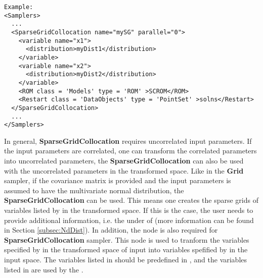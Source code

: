 
\footnotesize
\begin{lstlisting}[style=XML]
Example:
<Samplers>
  ...
  <SparseGridCollocation name="mySG" parallel="0">
    <variable name="x1">
      <distribution>myDist1</distribution>
    </variable>
    <variable name="x2">
      <distribution>myDist2</distribution>
    </variable>
    <ROM class = 'Models' type = 'ROM' >SCROM</ROM>
    <Restart class = 'DataObjects' type = 'PointSet' >solns</Restart>
  </SparseGridCollocation>
  ...
</Samplers>
\end{lstlisting}
 \normalsize

In general, \textbf{SparseGridCollocation} requires uncorrelated input parameters. If the input parameters are correlated, one can transform the 
correlated parameters into uncorrelated parameters, the \textbf{SparseGridCollocation} can also be used with the uncorrelated parameters
in the transformed space. Like in the \textbf{Grid} sampler, if the covariance matrix is provided 
and the input parameters is assumed to have the multivariate normal distribution, the \textbf{SparseGridCollocation} can be used.
This means one creates the sparse grids of variables listed by  in the transformed space. If this is 
the case, the user needs to provide additional information, i.e. the  under  
of  (more information can be found in Section \ref{subsec:NdDist}). In addition, the node 
 is also required for \textbf{SparseGridCollocation} sampler. This node is used to tranform 
the variables specified by  in the transformed space of input into variables spefified by 
 in the input space. The variables listed in  should be predefined 
in , and the variables listed in  
are used by the .



